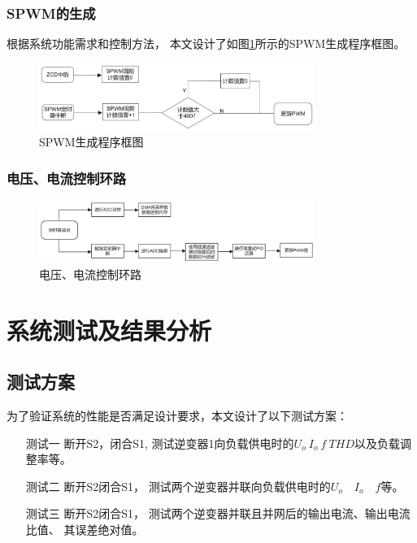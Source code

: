 \documentclass[a4paper,12pt]{article}
\begin{document}
\subsubsection{SPWM的生成}
根据系统功能需求和控制方法，
本文设计了如图\ref{fig12}所示的SPWM生成程序框图。
\begin{figure}[h]
    \centering
    \includegraphics[width=0.8\textwidth]{src/fig12.png}
    \caption{SPWM生成程序框图}
    \label{fig12}
\end{figure}

\newpage
\subsubsection{电压、电流控制环路}
\begin{figure}[h]
    \centering
    \includegraphics[width=0.8\textwidth]{src/fig3.png}
    \caption{电压、电流控制环路}
\end{figure}

\section{系统测试及结果分析}

\subsection{测试方案}
为了验证系统的性能是否满足设计要求，本文设计了以下测试方案：
\begin{itemize}
    \item[测试一] 断开S2，闭合S1,
    测试逆变器1向负载供电时的$U_o\ I_o\ f\ THD$以及负载调整率等。
    \item[测试二] 断开S2闭合S1，
    测试两个逆变器并联向负载供电时的$U_o\quad  I_o\quad  f$等。
    \item[测试三] 断开S2闭合S1，
    测试两个逆变器并联且并网后的输出电流、输出电流比值、
    其误差绝对值。
\end{itemize}
\end{document}
